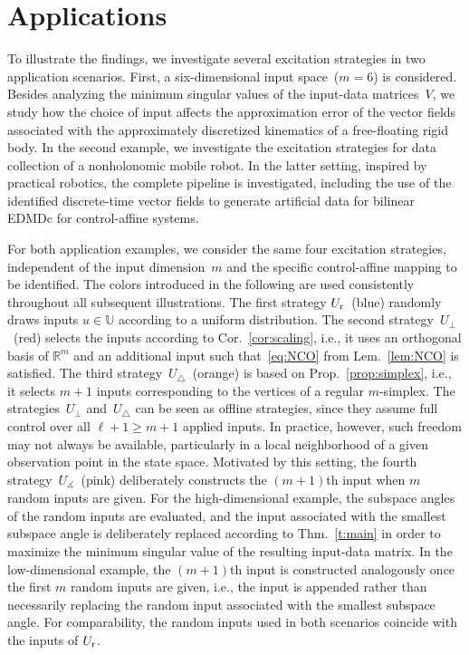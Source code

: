 \documentclass[a4paper, reqno]{amsart}
\newcommand{\R}{\ensuremath{\mathbb R}}
\newcommand{\dd}{\ell}
\begin{document}
\section{Applications}
\label{sec:application}
To illustrate the findings, we investigate several excitation strategies in two application scenarios.
First, a six-dimensional input space~($m=6$) is considered.
Besides analyzing the minimum singular values of the input-data matrices~$V$, we study how the choice of input affects the approximation error of the vector fields associated with the approximately discretized kinematics of a free-floating rigid body.
In the second example, we investigate the excitation strategies for data collection of a nonholonomic mobile robot.
In the latter setting, inspired by practical robotics, the complete pipeline is investigated, including the use of the identified discrete-time vector fields to generate artificial data for bilinear EDMDc for control-affine systems.

For both application examples, we consider the same four excitation strategies, independent of the input dimension~$m$ and the specific control-affine mapping to be identified.
The colors introduced in the following are used consistently throughout all subsequent illustrations. 
The first strategy $U_\textnormal{r}$~(blue) randomly draws inputs $u\in\mathbb{U}$ according to a uniform distribution.
The second strategy~$U_\perp$~(red) selects the inputs according to Cor.~\ref{cor:scaling}, i.e., it uses an orthogonal basis of $\R^m$ and an additional input such that~\eqref{eq:NCO} from Lem.~\ref{lem:NCO} is satisfied.
The third strategy~$U_\triangle$~(orange) is based on Prop.~\ref{prop:simplex}, i.e., it selects $m+1$ inputs corresponding to the vertices of a regular $m$-simplex. 
The strategies~$U_\perp$ and~$U_\triangle$ can be seen as offline strategies, since they assume full control over all $\dd+1\geq m+1$ applied inputs.
In practice, however, such freedom may not always be available, particularly in a local neighborhood of a given observation point in the state space.
Motivated by this setting, the fourth strategy~$U_{\measuredangle}$~(pink) deliberately constructs the $(m+1)$th input when $m$ random inputs are given.
For the high-dimensional example, the subspace angles of the random inputs are evaluated, and the input associated with the smallest subspace angle is deliberately replaced according to Thm.~\ref{t:main} in order to maximize the minimum singular value of the resulting input-data matrix.
In the low-dimensional example, the $(m+1)$th input is constructed analogously once the first $m$ random inputs are given, i.e., the input is appended rather than necessarily replacing the random input associated with the smallest subspace angle.
For comparability, the random inputs used in both scenarios coincide with the inputs of $U_{\textnormal{r}}$. 
\end{document}
